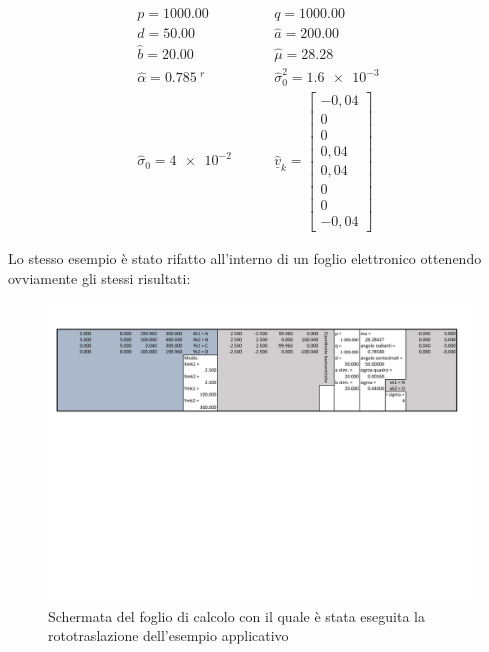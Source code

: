 \begin{align*}
	p=\SI{1000.00}{} \qquad &q=\SI{1000.00}{} \\
	d=\SI{50.00}{} \qquad &\hat{a}=\SI{200.00}{} \\
	\hat{b}=\SI{20.00}{} \qquad &\hat{\mu}=\SI{28.28}{} \\
	\hat{\alpha}=\SI{0.785}{^r} \qquad &\hat{\sigma}_0^2=\SI{1.6e-3}{}\\
	\hat{\sigma}_0=\SI{4e-2}{}	\qquad &\hat{\underline{v}}_k=
	\begin{bmatrix}
	-0,04 \\ 
	0 \\ 
	0 \\ 
	0,04 \\ 
	0,04 \\ 
	0 \\ 
	0 \\ 
	-0,04
	\end{bmatrix} 
\end{align*}

Lo stesso esempio è stato rifatto all'interno di un foglio elettronico ottenendo ovviamente gli stessi risultati:
\begin{figure}[H]
\centering
\includegraphics[width=16cm]{documents/rototraslazioneEsempio.pdf}
\caption{Schermata del foglio di calcolo con il quale è stata eseguita la rototraslazione dell'esempio applicativo}
\end{figure}
